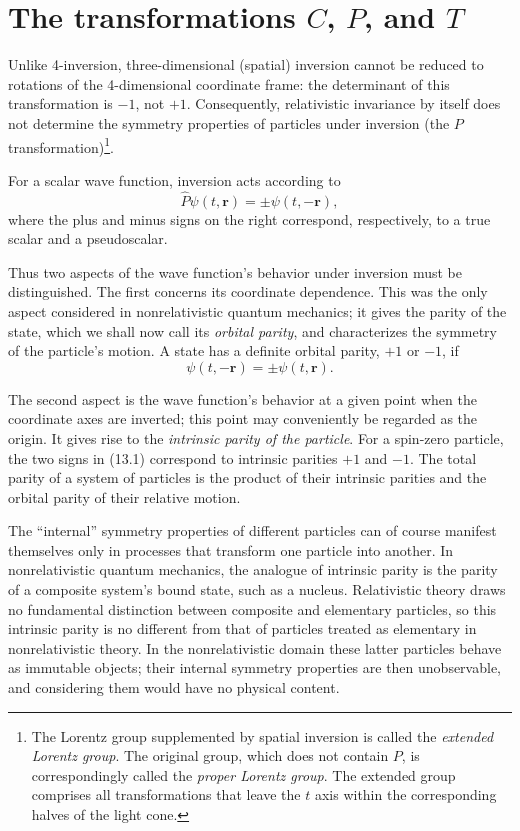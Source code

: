 
\section{The transformations \texorpdfstring{$C$, $P$, and $T$}{C, P, and T}}

Unlike 4-inversion, three-dimensional (spatial) inversion cannot be reduced to rotations of the 4-dimensional coordinate frame: the determinant of this transformation is $-1$, not $+1$. Consequently, relativistic invariance by itself does not determine the symmetry properties of particles under inversion (the $P$ transformation)\footnote{The Lorentz group supplemented by spatial inversion is called the \emph{extended Lorentz group}. The original group, which does not contain $P$, is correspondingly called the \emph{proper Lorentz group}. The extended group comprises all transformations that leave the $t$ axis within the corresponding halves of the light cone.}.

For a scalar wave function, inversion acts according to
\begin{equation}
\widehat P\psi(t,\mathbf{r})=\pm\psi(t,-\mathbf{r}),
\tag{13.1}
\end{equation}
where the plus and minus signs on the right correspond, respectively, to a true scalar and a pseudoscalar.

Thus two aspects of the wave function's behavior under inversion must be distinguished. The first concerns its coordinate dependence. This was the only aspect considered in nonrelativistic quantum mechanics; it gives the parity of the state, which we shall now call its \emph{orbital parity}, and characterizes the symmetry of the particle's motion. A state has a definite orbital parity, $+1$ or $-1$, if
\[
\psi(t,-\mathbf{r})=\pm\psi(t,\mathbf{r}).
\]

The second aspect is the wave function's behavior at a given point when the coordinate axes are inverted; this point may conveniently be regarded as the origin. It gives rise to the \emph{intrinsic parity of the particle}. For a spin-zero particle, the two signs in (13.1) correspond to intrinsic parities $+1$ and $-1$. The total parity of a system of particles is the product of their intrinsic parities and the orbital parity of their relative motion.

The ``internal'' symmetry properties of different particles can of course manifest themselves only in processes that transform one particle into another. In nonrelativistic quantum mechanics, the analogue of intrinsic parity is the parity of a composite system's bound state, such as a nucleus. Relativistic theory draws no fundamental distinction between composite and elementary particles, so this intrinsic parity is no different from that of particles treated as elementary in nonrelativistic theory. In the nonrelativistic domain these latter particles behave as immutable objects; their internal symmetry properties are then unobservable, and considering them would have no physical content.


